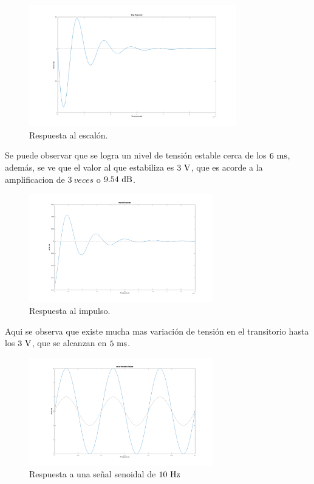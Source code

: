 \begin{figure}[hbt]
	\centering
	\includegraphics[width=9cm]{imagenes/stepTeorico}
	\caption{Respuesta al escal\'on.}
\end{figure}
Se puede observar que se logra un nivel de tensi\'on estable cerca de los $6 \ \si{\milli\second}$, adem\'as, se ve que el valor al que estabiliza es $3 \ \si{\volt}$, que es acorde a la  amplificacion de $3\ veces$ o $9.54 \dB$.\\

\begin{figure}[hbt]
	\centering
	\includegraphics[width=8cm]{imagenes/impulseTeorico}	\caption{Respuesta al impulso.}
\end{figure}
Aqui se observa que existe mucha mas variaci\'on de tensi\'on en el transitorio hasta los $3 \ \si{\volt}$, que se alcanzan en $5 \ \si{\milli\second}$.\\

\begin{figure}[hbt]
	\centering
	\includegraphics[width=8cm]{imagenes/rtasen10}	\caption{Respuesta a una señal senoidal de $10\ \si{\hertz}$}	
\end{figure}

